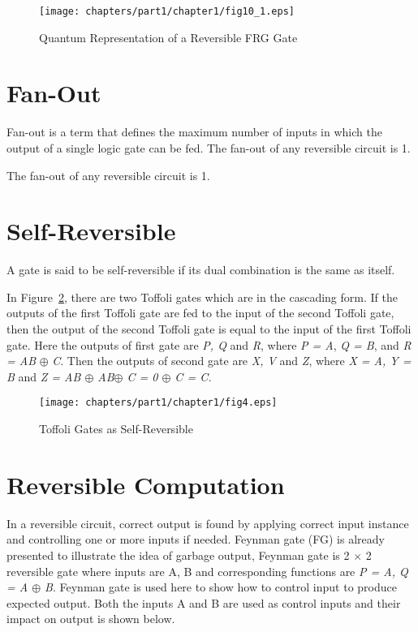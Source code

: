 \begin{figure}[H]
	\centering
	\texttt{[image: chapters/part1/chapter1/fig10\_1.eps]}
	\caption{Quantum  Representation  of  a  Reversible FRG Gate}
	\label{fig:p1_c1_fig10_1}
\end{figure}



\section{Fan-Out}
Fan-out is a term that defines the maximum number of inputs in which the output of a single logic gate can be fed. The fan-out of any reversible circuit is 1.
\begin{example}\textnormal{
	The fan-out of any reversible circuit is 1.}
\end{example}


\section{Self-Reversible}
A gate is said to be self-reversible if its dual combination is the same as itself.

\begin{example}\textnormal{
	In Figure~\ref{fig:p1_c1_fig4}, there are two Toffoli gates which are in the cascading form. If the outputs of the first Toffoli gate are fed to the input of the second Toffoli gate, then the output of the second Toffoli gate is equal to the input of the first Toffoli gate.
Here the outputs of first gate are \textit{P, Q} and \textit{R}, where \textit{P = A}, \textit{Q = B}, and \textit{R = AB} $\oplus$ \textit{C}. Then the outputs of second gate are \textit{X, V} and \textit{Z}, where \textit{X = A, Y = B} and \textit{Z = AB $\oplus$ AB$\oplus$ C = 0 $\oplus$ C = C.}}
\end{example}



\begin{figure}[h]
	\centering
	\texttt{[image: chapters/part1/chapter1/fig4.eps]}
	\caption{Toffoli Gates as Self-Reversible}
	\label{fig:p1_c1_fig4}
\end{figure}

\section{Reversible Computation}
In a reversible circuit, correct output is found by applying correct input instance and controlling one or more inputs if needed. Feynman gate (FG) is already presented to illustrate the idea of garbage output, Feynman gate is 2 $\times$ 2 reversible gate where inputs are A, B and corresponding functions are \textit{P = A, Q = A $\oplus$ B}. Feynman gate is used here to show how to control input to produce expected output. Both the inputs A and B are used as control inputs and their impact on output is shown below.

